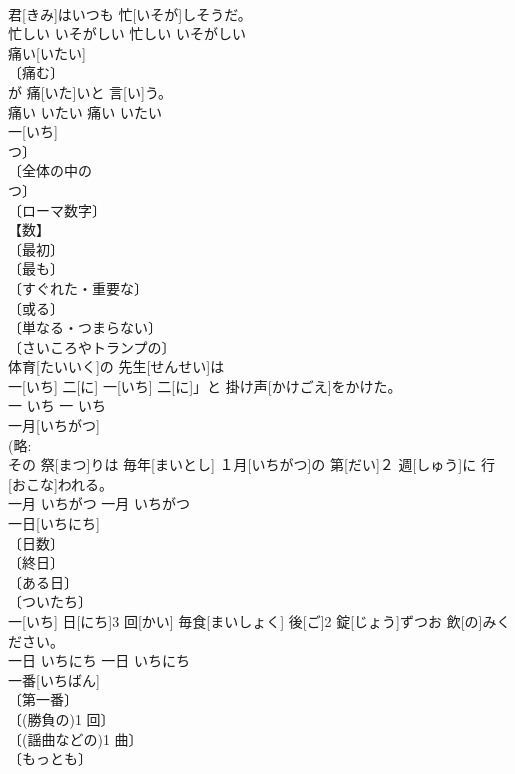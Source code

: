 \documentclass[8pt]{extreport}
\begin{document}
\begin{CJK}{UTF8}{min}
\\	君[きみ]はいつも 忙[いそが]しそうだ。	
\\	忙しい	いそがしい	忙しい	いそがしい	
\\	痛い[いたい]	
\\	〔痛む〕 
\\	[＝いたむ２ 
\\	〔つらい〕 
\\	〔困る〕 
\\	腹[はら]が 痛[いた]いと 言[い]う。	
\\	痛い	いたい	痛い	いたい	
\\	一[いち]	
\\	つ〕 
\\	〔全体の中の 
\\	つ〕 
\\	〔ローマ数字〕 
\\	【数】 
\\	〔最初〕 
\\	〔最も〕 
\\	〔すぐれた・重要な〕 
\\	〔或る〕 
\\	〔単なる・つまらない〕 
\\	〔さいころやトランプの〕 
\\	体育[たいいく]の 先生[せんせい]は
\\	一[いち] 二[に] 一[いち] 二[に]」と 掛け声[かけごえ]をかけた。	
\\	一	いち	一	いち	
\\	一月[いちがつ]	
\\	(略: 
\\	その 祭[まつ]りは 毎年[まいとし] １月[いちがつ]の 第[だい]２ 週[しゅう]に 行[おこな]われる。	
\\	一月	いちがつ	一月	いちがつ	
\\	一日[いちにち]	
\\	〔日数〕 
\\	〔終日〕 
\\	〔ある日〕 
\\	〔ついたち〕 
\\	一[いち] 日[にち]3 回[かい] 毎食[まいしょく] 後[ご]2 錠[じょう]ずつお 飲[の]みください。	
\\	一日	いちにち	一日	いちにち	
\\	一番[いちばん]	
\\	〔第一番〕 
\\	〔(勝負の)1 回〕 
\\	〔(謡曲などの)1 曲〕 
\\	〔もっとも〕 

\end{CJK}
\end{document}
